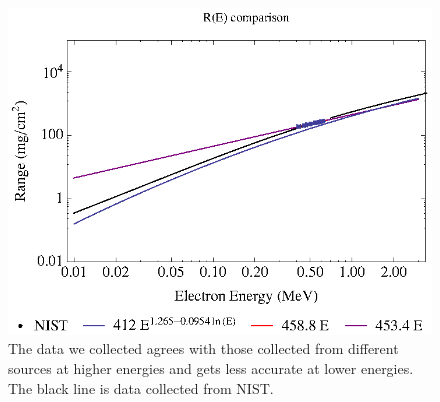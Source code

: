 \begin{figure}[tbp]
	\centering
		\includegraphics[width=.8\textwidth]{Figures/R_E_Error_ComparisonFull.eps}
	\caption{The data we collected agrees with those collected from different sources at higher energies and gets less accurate at lower energies.  The black line is data collected from NIST.}
	\label{fig:Figures_R_E_Error_ComparisonFull}
\end{figure}%
